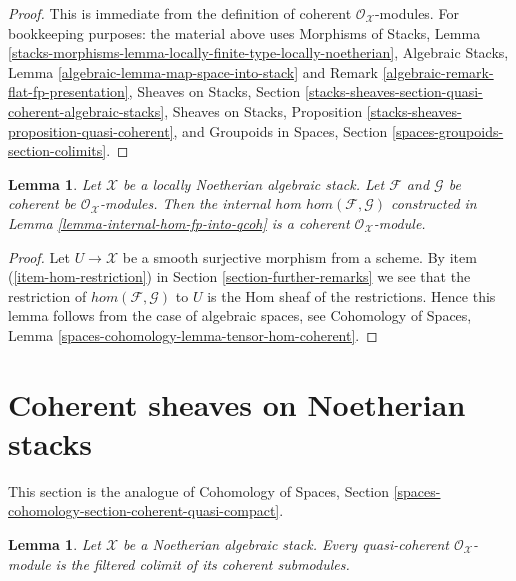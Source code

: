 \documentclass{stacks-project}
\theoremstyle{plain}
\newtheorem{lemma}[subsection]{Lemma}
\theoremstyle{definition}
\theoremstyle{remark}
\numberwithin{equation}{subsection}
\begin{document}
\begin{proof}
This is immediate from the definition of coherent
$\mathcal{O}_\mathcal{X}$-modules.
For bookkeeping purposes: the material above uses
Morphisms of Stacks, Lemma
\ref{stacks-morphisms-lemma-locally-finite-type-locally-noetherian},
Algebraic Stacks, Lemma \ref{algebraic-lemma-map-space-into-stack} and
Remark \ref{algebraic-remark-flat-fp-presentation},
Sheaves on Stacks, Section
\ref{stacks-sheaves-section-quasi-coherent-algebraic-stacks},
Sheaves on Stacks, Proposition \ref{stacks-sheaves-proposition-quasi-coherent},
and Groupoids in Spaces, Section
\ref{spaces-groupoids-section-colimits}.
\end{proof}

\begin{lemma}
\label{lemma-coherent-hom}
Let $\mathcal{X}$ be a locally Noetherian algebraic stack. Let $\mathcal{F}$
and $\mathcal{G}$ be coherent be $\mathcal{O}_\mathcal{X}$-modules. Then
the internal hom $hom(\mathcal{F}, \mathcal{G})$
constructed in Lemma \ref{lemma-internal-hom-fp-into-qcoh}
is a coherent $\mathcal{O}_\mathcal{X}$-module.
\end{lemma}

\begin{proof}
Let $U \to \mathcal{X}$ be a smooth surjective morphism from a scheme.
By item (\ref{item-hom-restriction}) in Section \ref{section-further-remarks}
we see that the restriction of
$hom(\mathcal{F}, \mathcal{G})$ to $U$ is the Hom sheaf of the restrictions.
Hence this lemma follows from the case of algebraic spaces, see
Cohomology of Spaces, Lemma \ref{spaces-cohomology-lemma-tensor-hom-coherent}.
\end{proof}






\section{Coherent sheaves on Noetherian stacks}
\label{section-coherent-on-noetherian}

\noindent
This section is the analogue of
Cohomology of Spaces, Section
\ref{spaces-cohomology-section-coherent-quasi-compact}.

\begin{lemma}
\label{lemma-directed-colimit-coherent}
Let $\mathcal{X}$ be a Noetherian algebraic stack. Every quasi-coherent
$\mathcal{O}_\mathcal{X}$-module is the filtered colimit of its coherent
submodules.
\end{lemma}
\end{document}
